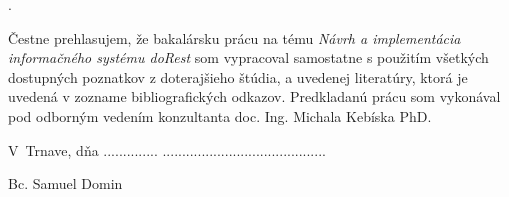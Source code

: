 \newpage
\phantom.
\vspace{12cm}

\vspace{2em}

Čestne prehlasujem, že bakalársku prácu na tému \textit{Návrh a implementácia informačného systému doRest} som vypracoval samostatne s použitím všetkých dostupných poznatkov z doterajšieho štúdia, a uvedenej literatúry, ktorá je uvedená v zozname bibliografických odkazov. Predkladanú prácu som vykonával pod odborným vedením konzultanta doc. Ing. Michala Kebíska PhD.


\vspace{2em}

\noindent
V~Trnave, dňa ..............
\hfill
..........................................


\hfill
Bc. Samuel Domin \qquad\quad
